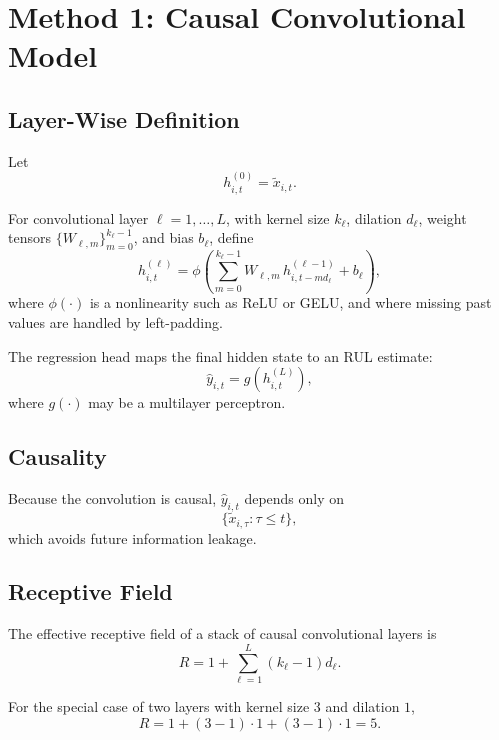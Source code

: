 \documentclass[11pt,a4paper]{article}
\begin{document}
\section{Method 1: Causal Convolutional Model}
\subsection{Layer-Wise Definition}
Let
\begin{equation}
    h_{i,t}^{(0)} = \tilde{x}_{i,t}.
\end{equation}

For convolutional layer $\ell = 1,\dots,L$, with kernel size $k_\ell$, dilation $d_\ell$, weight tensors $\{W_{\ell,m}\}_{m=0}^{k_\ell-1}$, and bias $b_\ell$, define
\begin{equation}
    h_{i,t}^{(\ell)} =
    \phi\left(
        \sum_{m=0}^{k_\ell-1}
        W_{\ell,m} \, h_{i,t-m d_\ell}^{(\ell-1)}
        + b_\ell
    \right),
\end{equation}
where $\phi(\cdot)$ is a nonlinearity such as ReLU or GELU, and where missing past values are handled by left-padding.

The regression head maps the final hidden state to an RUL estimate:
\begin{equation}
    \hat{y}_{i,t} = g\left(h_{i,t}^{(L)}\right),
\end{equation}
where $g(\cdot)$ may be a multilayer perceptron.

\subsection{Causality}
Because the convolution is causal, $\hat{y}_{i,t}$ depends only on
\begin{equation}
    \{\tilde{x}_{i,\tau} : \tau \leq t\},
\end{equation}
which avoids future information leakage.

\subsection{Receptive Field}
The effective receptive field of a stack of causal convolutional layers is
\begin{equation}
    R = 1 + \sum_{\ell=1}^{L} (k_\ell - 1)d_\ell.
\end{equation}

For the special case of two layers with kernel size $3$ and dilation $1$,
\begin{equation}
    R = 1 + (3-1)\cdot 1 + (3-1)\cdot 1 = 5.
\end{equation}
\end{document}
